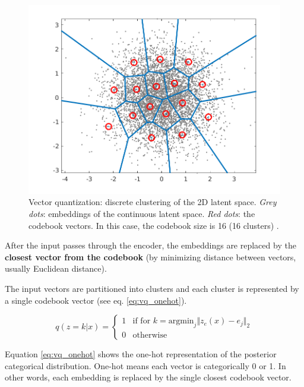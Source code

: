 \begin{figure}[h]
    \centering
    \includegraphics[scale=0.5]{images/vq_visualization.png}
    \caption{Vector quantization: discrete clustering of the 2D latent space. \textit{Grey dots}: embeddings of the continuous latent space. \textit{Red dots}: the codebook vectors. In this case, the codebook size is 16 (16 clusters) \cite{vq_visualization_website}.}
    \label{figure:vq_visualization}
\end{figure}

After the input passes through the encoder, the embeddings are replaced by the \textbf{closest vector from the codebook} (by minimizing distance between vectors, usually Euclidean distance). 

The input vectors are partitioned into clusters and each cluster is represented by a single codebook vector (see eq. \ref{eq:vq_onehot}).

\begin{equation}
    \label{eq:vq_onehot}
    q(z=k|x) = \begin{cases}
        1 & \text{if } \text{for } k=\text{argmin}_j \Vert z_e(x) - e_j \Vert_2 \\
        0 & \text{otherwise}
    \end{cases}
\end{equation}

Equation \ref{eq:vq_onehot} shows the one-hot representation of the posterior categorical distribution. One-hot means each vector is categorically 0 or 1. In other words, each embedding is replaced by the single closest codebook vector.







